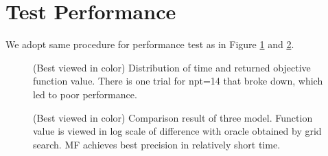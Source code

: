 \documentclass[10pt, oneside]{article}
\begin{document}
 \section{Test Performance}
 \label{ap2}
 
 We adopt same procedure for performance test as in Figure \ref{fig:npt2} and \ref{fig:compare2}. 
\begin{figure}[H]
\centering

   \caption{(Best viewed in color) Distribution of time and returned objective function value. There is one trial for npt=14 that broke down, which led to poor performance. }
   \label{fig:npt2}
  \end{figure}


\begin{figure}[H]
\centering

   \caption{(Best viewed in color) Comparison result of three model. Function value is viewed in log scale of difference with oracle obtained by grid search. MF achieves best precision in relatively short time. }
   \label{fig:compare2}
  \end{figure}
\end{document}
